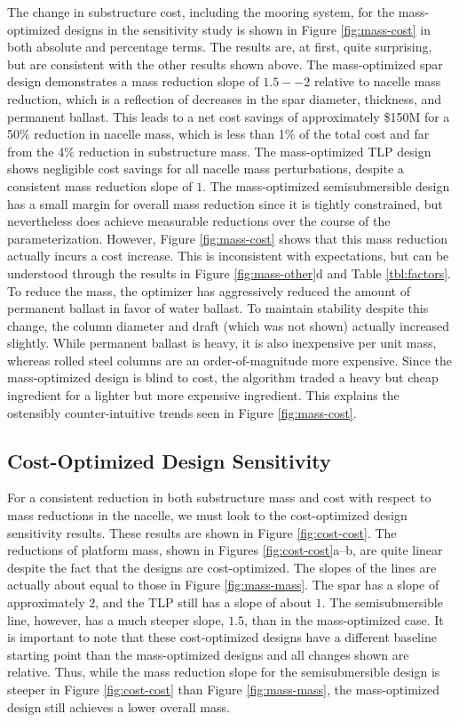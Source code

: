 The change in substructure cost, including the mooring system, for the
mass-optimized designs in the sensitivity study is shown in Figure
\ref{fig:mass-cost} in both absolute and percentage terms.  The results
are, at first, quite surprising, but are consistent with the other
results shown above.  The mass-optimized spar design demonstrates a
mass reduction slope of $1.5--2$ relative to nacelle mass reduction,
which is a reflection of decreases in the spar diameter, thickness, and
permanent ballast.  This leads to a net cost savings of approximately
\$150M for a 50\% reduction in nacelle mass, which is less than 1\% of
the total cost and far from the 4\% reduction in substructure mass.  The
mass-optimized TLP design shows negligible cost savings for all nacelle
mass perturbations, despite a consistent mass reduction slope of $1$.
The mass-optimized semisubmersible design has a small margin for overall
mass reduction since it is tightly constrained, but nevertheless does
achieve measurable reductions over the course of the parameterization.
However, Figure \ref{fig:mass-cost} shows that this mass reduction
actually incurs a cost increase.  This is inconsistent with
expectations, but can be understood through the results in Figure
\ref{fig:mass-other}d and Table \ref{tbl:factors}.  To reduce the mass,
the optimizer has aggressively reduced the amount of permanent ballast
in favor of water ballast.  To maintain stability despite this change,
the column diameter and draft (which was not shown) actually increased
slightly.  While permanent ballast is heavy, it is also inexpensive per
unit mass, whereas rolled steel columns are an order-of-magnitude more
expensive.  Since the mass-optimized design is blind to cost, the
algorithm traded a heavy but cheap ingredient for a lighter but more
expensive ingredient.  This explains the ostensibly counter-intuitive
trends seen in Figure \ref{fig:mass-cost}.

\subsection{Cost-Optimized Design Sensitivity}
For a consistent reduction in both substructure mass and cost with
respect to mass reductions in the nacelle, we must look to the
cost-optimized design sensitivity results.  These results are shown in
Figure \ref{fig:cost-cost}.  The reductions of platform mass, shown in
Figures \ref{fig:cost-cost}a--b, are quite linear despite the fact that
the designs are cost-optimized.  The slopes of the lines are actually
about equal to those in Figure \ref{fig:mass-mass}.  The spar has a
slope of approximately $2$, and the TLP still has a slope of about $1$.
The semisubmersible line, however, has a much steeper slope, $1.5$, than
in the mass-optimized case.  It is important to note that these
cost-optimized designs have a different baseline starting point than the
mass-optimized designs and all changes shown are relative.  Thus, while
the mass reduction slope for the semisubmersible design is steeper in
Figure \ref{fig:cost-cost} than Figure \ref{fig:mass-mass}, the
mass-optimized design still achieves a lower overall mass.

